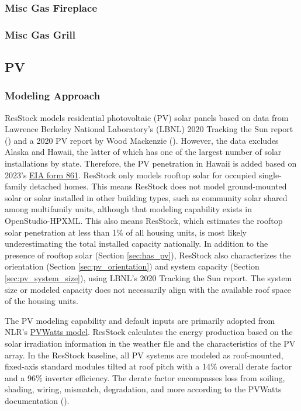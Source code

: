 \subsubsection{Misc Gas Fireplace}


\subsubsection{Misc Gas Grill}


\subsection{PV}
\subsubsection{Modeling Approach}
ResStock models residential photovoltaic (PV) solar panels based on data from Lawrence Berkeley National Laboratory's (LBNL) 2020 Tracking the Sun report (\cite{LBNLTTS2019}) and a 2020 PV report by Wood Mackenzie (\cite{WoodsMackenzie2020}). However, the data excludes Alaska and Hawaii, the latter of which has one of the largest number of solar installations by state. Therefore, the PV penetration in Hawaii is added based on 2023's \href{https://www.eia.gov/electricity/data/eia861/}{EIA form 861}. ResStock only models rooftop solar for occupied single-family detached homes. This means ResStock does not model ground-mounted solar or solar installed in other building types, such as community solar shared among multifamily units, although that modeling capability exists in OpenStudio-HPXML. This also means ResStock, which estimates the rooftop solar penetration at less than 1\% of all housing units, is most likely underestimating the total installed capacity nationally. In addition to the presence of rooftop solar (Section \ref{sec:has_pv}), ResStock also characterizes the orientation (Section \ref{sec:pv_orientation}) and system capacity (Section \ref{sec:pv_system_size}), using LBNL's 2020 Tracking the Sun report. The system size or modeled capacity does not necessarily align with the available roof space of the housing units.

The PV modeling capability and default inputs are primarily adopted from NLR's \href{https://pvwatts.nrel.gov/index.php}{PVWatts model}. ResStock calculates the energy production based on the solar irradiation information in the weather file and the characteristics of the PV array. In the ResStock baseline, all PV systems are modeled as roof-mounted, fixed-axis standard modules tilted at roof pitch with a 14\% overall derate factor and a 96\% inverter efficiency. The derate factor encompasses loss from soiling, shading, wiring, mismatch, degradation, and more according to the PVWatts documentation (\cite{pvwatts_doc}).

